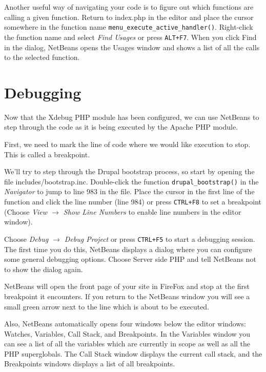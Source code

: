 \documentclass[draft,ebook,10pt,twoside,openright]{memoir}
\begin{document}
Another useful way of navigating your code is to figure out which functions are calling a given function. Return to index.php in the editor and place the cursor somewhere in the function name \verb!menu_execute_active_handler()!. Right-click the function name and select \emph{Find Usages} or press \verb!ALT+F7!. When you click Find in the dialog, NetBeans opens the Usages window and shows a list of all the calls to the selected function.


\section{Debugging}

Now that the Xdebug PHP module has been configured, we can use NetBeans to step through the code as it is being executed by the Apache PHP module.

First, we need to mark the line of code where we would like execution to stop. This is called a breakpoint.

We’ll try to step through the Drupal bootstrap process, so start by opening the file includes/bootstrap.inc. Double-click the function \verb!drupal_bootstrap()! in the \emph{Navigator} to jump to line 983 in the file. Place the cursor in the first line of the function and click the line number (line 984) or press \verb!CTRL+F8! to set a breakpoint (Choose \emph{View $\rightarrow$ Show Line Numbers} to enable line numbers in the editor window).

Choose \emph{Debug $\rightarrow$ Debug Project} or press \verb!CTRL+F5! to start a debugging session. The first time you do this, NetBeans displays a dialog where you can configure some general debugging options. Choose Server side PHP and tell NetBeans not to show the dialog again.

NetBeans will open the front page of your site in FireFox and stop at the first breakpoint it encounters. If you return to the NetBeans window you will see a small green arrow next to the line which is about to be executed.

Also, NetBeans automatically opens four windows below the editor windows: Watches, Variables, Call Stack, and Breakpoints. In the Variables window you can see a list of all the variables which are currently in scope as well as all the PHP superglobals. The Call Stack window displays the current call stack, and the Breakpoints windows displays a list of all breakpoints.
\end{document}
